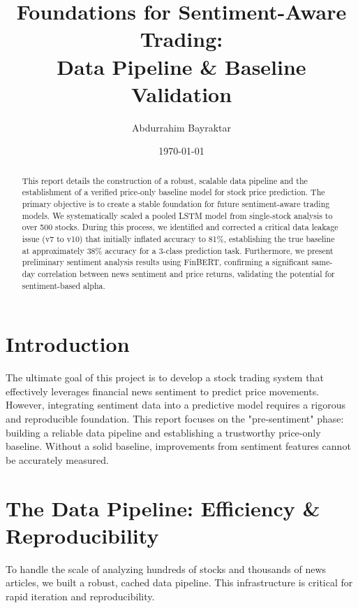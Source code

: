\documentclass{article}
\title{Foundations for Sentiment-Aware Trading: \\ Data Pipeline \& Baseline Validation}
\author{Abdurrahim Bayraktar}
\date{\today}
\begin{document}
\maketitle

\begin{abstract}
This report details the construction of a robust, scalable data pipeline and the establishment of a verified price-only baseline model for stock price prediction. The primary objective is to create a stable foundation for future sentiment-aware trading models. We systematically scaled a pooled LSTM model from single-stock analysis to over 500 stocks. During this process, we identified and corrected a critical data leakage issue (v7 to v10) that initially inflated accuracy to 81\%, establishing the true baseline at approximately 38\% accuracy for a 3-class prediction task. Furthermore, we present preliminary sentiment analysis results using FinBERT, confirming a significant same-day correlation between news sentiment and price returns, validating the potential for sentiment-based alpha.
\end{abstract}

\section{Introduction}
The ultimate goal of this project is to develop a stock trading system that effectively leverages financial news sentiment to predict price movements. However, integrating sentiment data into a predictive model requires a rigorous and reproducible foundation. This report focuses on the "pre-sentiment" phase: building a reliable data pipeline and establishing a trustworthy price-only baseline. Without a solid baseline, improvements from sentiment features cannot be accurately measured.

\section{The Data Pipeline: Efficiency \& Reproducibility}
To handle the scale of analyzing hundreds of stocks and thousands of news articles, we built a robust, cached data pipeline. This infrastructure is critical for rapid iteration and reproducibility.
\end{document}
